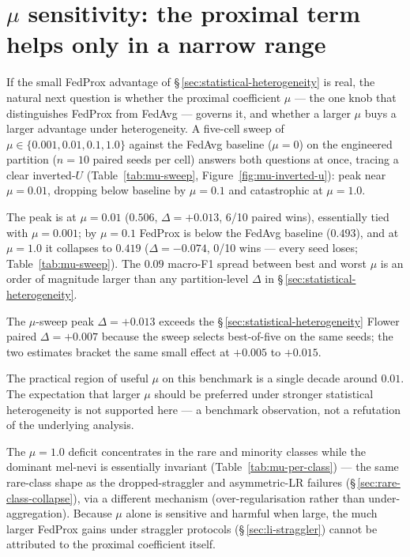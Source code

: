 \documentclass[11pt,a4paper]{report}
\begin{document}
\section{$\mu$ sensitivity: the proximal term helps only in a narrow range}
\label{sec:mu-sensitivity}

If the small FedProx advantage of \S\,\ref{sec:statistical-heterogeneity} is
real, the natural next question is whether the proximal coefficient $\mu$ ---
the one knob that distinguishes FedProx from FedAvg --- governs it, and whether
a larger $\mu$ buys a larger advantage under heterogeneity. A five-cell sweep
of $\mu \in \{0.001, 0.01, 0.1, 1.0\}$ against the FedAvg
baseline ($\mu = 0$) on the engineered partition ($n=10$ paired seeds per
cell) answers both questions at once, tracing a clear inverted-$U$
(Table~\ref{tab:mu-sweep},
Figure~\ref{fig:mu-inverted-u}): peak near $\mu = 0.01$, dropping below
baseline by $\mu = 0.1$ and catastrophic at $\mu = 1.0$.

The peak is at $\mu = 0.01$ ($0.506$, $\Delta = +0.013$, 6/10 paired wins),
essentially tied with $\mu = 0.001$; by $\mu = 0.1$ FedProx is below the FedAvg
baseline ($0.493$), and at $\mu = 1.0$ it collapses to $0.419$
($\Delta = -0.074$, 0/10 wins --- every seed loses; Table~\ref{tab:mu-sweep}).
The $0.09$ macro-F1 spread between best and worst $\mu$ is an order of magnitude
larger than any partition-level $\Delta$ in
\S\,\ref{sec:statistical-heterogeneity}.

The $\mu$-sweep peak $\Delta = +0.013$ exceeds the
\S\,\ref{sec:statistical-heterogeneity} Flower paired $\Delta = +0.007$
because the sweep selects best-of-five on the same seeds; the two estimates
bracket the same small effect at $+0.005$ to $+0.015$.

The practical region of useful $\mu$ on this benchmark is a single decade
around $0.01$. The expectation that larger $\mu$ should be preferred under
stronger statistical heterogeneity is not supported here --- a benchmark
observation, not a refutation of the underlying analysis.

The $\mu = 1.0$ deficit concentrates in the rare and minority classes while the
dominant mel-nevi is essentially invariant (Table~\ref{tab:mu-per-class}) --- the
same rare-class shape as the dropped-straggler and asymmetric-LR failures
(\S\,\ref{sec:rare-class-collapse}), via a different mechanism
(over-regularisation rather than under-aggregation). Because $\mu$ alone is
sensitive and harmful when large, the much larger FedProx gains under straggler
protocols (\S\,\ref{sec:li-straggler}) cannot be attributed to the proximal
coefficient itself.
\end{document}
